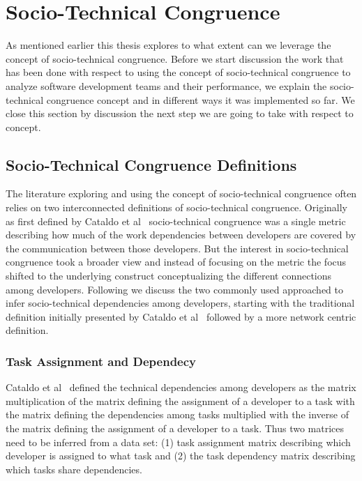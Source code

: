 \section{Socio-Technical Congruence}
As mentioned earlier this thesis explores to what extent can we leverage the concept of socio-technical congruence. 
Before we start discussion the work that has been done with respect to using the concept of socio-technical congruence to analyze software development teams and their performance, we explain the socio-technical congruence concept and in different ways it was implemented so far.
We close this section by discussion the next step we are going to take with respect to concept.

\subsection{Socio-Technical Congruence Definitions}
The literature exploring and using the concept of socio-technical congruence often relies on two interconnected definitions of socio-technical congruence.
Originally as first defined by Cataldo et al~\cite{cataldo:cscw:2006} socio-technical congruence was a single metric describing how much of the work dependencies between developers are covered by the communication between those developers.
But the interest in socio-technical congruence took a broader view and instead of focusing on the metric the focus shifted to the underlying construct conceptualizing the different connections among developers.
Following we discuss the two commonly used approached to infer socio-technical dependencies among developers, starting with the traditional definition initially presented by Cataldo et al~\cite{cataldo:cscw:2006} followed by a more network centric definition.

\subsubsection{Task Assignment and Dependecy}
Cataldo et al~\cite{cataldo:cscw:2006} defined the technical dependencies among developers as the matrix multiplication of the matrix defining the assignment of a developer to a task with the matrix defining the dependencies among tasks multiplied with the inverse of the matrix defining the assignment of a developer to a task.
Thus two matrices need to be inferred from a data set: (1) task assignment matrix describing which developer is assigned to what task and (2) the task dependency matrix describing which tasks share dependencies.

